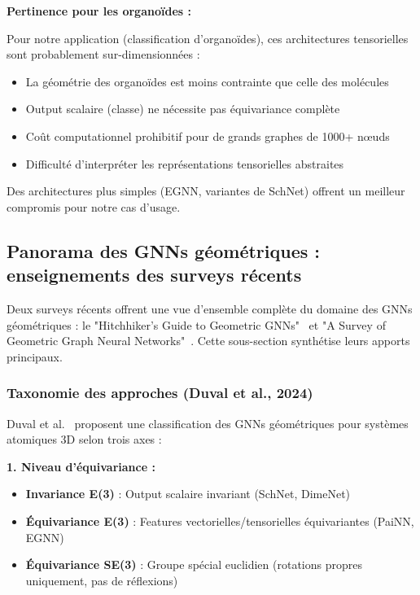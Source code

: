 \textbf{Pertinence pour les organoïdes :}

Pour notre application (classification d'organoïdes), ces architectures tensorielles sont probablement sur-dimensionnées :
\begin{itemize}
    \item La géométrie des organoïdes est moins contrainte que celle des molécules
    \item Output scalaire (classe) ne nécessite pas équivariance complète
    \item Coût computationnel prohibitif pour de grands graphes de 1000+ nœuds
    \item Difficulté d'interpréter les représentations tensorielles abstraites
\end{itemize}

Des architectures plus simples (EGNN, variantes de SchNet) offrent un meilleur compromis pour notre cas d'usage.

\subsection{Panorama des GNNs géométriques : enseignements des surveys récents}

Deux surveys récents offrent une vue d'ensemble complète du domaine des GNNs géométriques : le "Hitchhiker's Guide to Geometric GNNs"~\cite{Duval2024} et "A Survey of Geometric Graph Neural Networks"~\cite{Han2024}. Cette sous-section synthétise leurs apports principaux.

\subsubsection{Taxonomie des approches (Duval et al., 2024)}

Duval et al.~\cite{Duval2024} proposent une classification des GNNs géométriques pour systèmes atomiques 3D selon trois axes :

\textbf{1. Niveau d'équivariance :}
\begin{itemize}
    \item \textbf{Invariance E(3)} : Output scalaire invariant (SchNet, DimeNet)
    \item \textbf{Équivariance E(3)} : Features vectorielles/tensorielles équivariantes (PaiNN, EGNN)
    \item \textbf{Équivariance SE(3)} : Groupe spécial euclidien (rotations propres uniquement, pas de réflexions)
\end{itemize}

